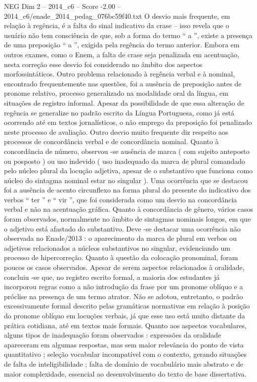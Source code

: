 \begin{textsample}{NEG Dim 2 – 2014\_c6 – Score -2.00 – 2014\_c6/enade\_2014\_pedag\_076bc59f40.txt}
O desvio mais frequente, em relação à regência, é a falta do sinal indicativo da crase – isso revela que o usuário não tem consciência de que, sob a forma do termo “ a ”, existe a presença de uma preposição “ a ”, exigida pela regência do termo anterior.
Embora em outros exames, como o Enem, a falta de crase seja penalizada em acentuação, nesta correção esse desvio foi considerado no âmbito dos aspectos morfossintáticos.
Outro problema relacionado à regência verbal e à nominal, encontrado frequentemente nas questões, foi a ausência de preposição antes de pronome relativo, processo generalizado na modalidade oral da língua, em situações de registro informal.
Apesar da possibilidade de que essa alteração de regência se generalize no padrão escrito da Língua Portuguesa, como já está ocorrendo até em textos jornalísticos, o não emprego da preposição foi penalizado neste processo de avaliação.
Outro desvio muito frequente diz respeito aos processos de concordância verbal e de concordância nominal.
Quanto à concordância de número, observou -se ausência de marca ( com sujeito anteposto ou posposto ) ou uso indevido ( uso inadequado da marca de plural comandado pelo núcleo plural da locução adjetiva, apesar de o substantivo que funciona como núcleo do sintagma nominal estar no singular ).
Uma ocorrência que se destacou foi a ausência de acento circunflexo na forma plural do presente do indicativo dos verbos “ ter ” e “ vir ”, que foi considerada como um desvio na concordância verbal e não na acentuação gráfica.
Quanto à concordância de gênero, vários casos foram observados, normalmente no âmbito de sintagmas nominais longos, em que o adjetivo está afastado do substantivo.
Deve -se destacar uma ocorrência não observada no Enade/2013 : o aparecimento da marca de plural em verbos ou adjetivos relacionados a núcleos substantivos no singular, evidenciando um processo de hipercorreção.
Quanto à questão da colocação pronominal, foram poucos os casos observados.
Apesar de serem aspectos relacionados à oralidade, concluiu -se que, no registro escrito formal, a maioria dos estudantes já incorporou regras como a não introdução da frase por um pronome oblíquo e a próclise na presença de um termo atrator.
Não se adotou, entretanto, o padrão excessivamente formal descrito pelas gramáticas normativas em relação à posição do pronome oblíquo em locuções verbais, já que esse uso está muito distante da prática cotidiana, até em textos mais formais.
Quanto aos aspectos vocabulares, alguns tipos de inadequação foram observados : expressões da oralidade apareceram em algumas respostas, mas sem maior relevância do ponto de vista quantitativo ; seleção vocabular incompatível com o contexto, gerando situações de falta de inteligibilidade ; falta de domínio de vocabulário mais abstrato e de maior complexidade, essencial ao desenvolvimento do texto de base dissertativa.

\end{textsample}
